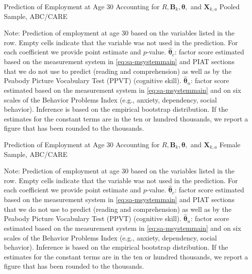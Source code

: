 \begin{table}
\begin{threeparttable}
\caption{Prediction of Employment at Age 30 Accounting for $R, \bm{B}_k, \bm{\theta},$ and $\bm{X}_{k,a}$ Pooled Sample, ABC/CARE}
\label{table:end2}
\centering
\scriptsize

\begin{tablenotes}
\footnotesize
\item Note: Prediction of employment at age 30 based on the variables listed in the row. Empty cells indicate that the variable was not used in the prediction. For each coefficient we provide point estimate and $p$-value. $\hat{\bm{\theta}}_{c}$: factor score estimated based on the measurement system in \eqref{eq:sa-msystemmain} and PIAT sections that we do not use to predict (reading and comprehension) as well as by the Peabody Picture Vocabulary Test (PPVT) (cognitive skill). $\hat{\bm{\theta}}_{n}$: factor score estimated based on the measurement system in \eqref{eq:sa-msystemmain} and on six scales of the Behavior Problems Index (e.g., anxiety, dependency, social behavior). Inference is based on the empirical bootstrap distribution. If the estimates for the constant terms are in the ten or hundred thousands, we report a figure that has been rounded to the thousands.
\end{tablenotes}
\end{threeparttable}
\end{table}

\begin{table}
\begin{threeparttable}
\caption{Prediction of Employment at Age 30 Accounting for $R, \bm{B}_k, \bm{\theta},$ and $\bm{X}_{k,a}$ Female Sample, ABC/CARE}
\label{table:end2}
\centering
\scriptsize

\begin{tablenotes}
\footnotesize
\item Note: Prediction of employment at age 30 based on the variables listed in the row. Empty cells indicate that the variable was not used in the prediction. For each coefficient we provide point estimate and $p$-value. $\hat{\bm{\theta}}_{c}$: factor score estimated based on the measurement system in \eqref{eq:sa-msystemmain} and PIAT sections that we do not use to predict (reading and comprehension) as well as by the Peabody Picture Vocabulary Test (PPVT) (cognitive skill). $\hat{\bm{\theta}}_{n}$: factor score estimated based on the measurement system in \eqref{eq:sa-msystemmain} and on six scales of the Behavior Problems Index (e.g., anxiety, dependency, social behavior). Inference is based on the empirical bootstrap distribution. If the estimates for the constant terms are in the ten or hundred thousands, we report a figure that has been rounded to the thousands.
\end{tablenotes}
\end{threeparttable}
\end{table}

